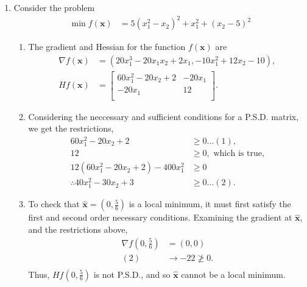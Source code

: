 \documentclass[a4paper,11pt]{article}
\newcommand{\ds}{\displaystyle}
\begin{document}
{{\begin{enumerate}[leftmargin=*]
		\item Consider the problem
			\begin{align*}
				\min f(\mathbf{x}) & = 5(x_1^2 - x_2)^2 + x_1^2 + (x_2-5)^2
			\end{align*}
			\begin{enumerate}[label=\alph*)]
				\item The gradient and Hessian for the function $\ds{f(\mathbf{x})}$ are
					\begin{align*}
						\nabla f(\mathbf{x}) & = \left(20x_1^3-20x_1x_2+2x_1, -10x_1^2+12x_2-10\right), \\
						Hf(\mathbf{x}) & = 
						\begin{bmatrix}
							60x_1^2-20x_2+2 & -20x_1 \\
							-20x_1 & 12 \\
						\end{bmatrix}.
					\end{align*}
				\item Considering the neccessary and sufficient conditions for a P.S.D. matrix, we get the restrictions,
					\begin{align*}
						60x_1^2-20x_2+2 & \geq 0 \dots (1), \\
						12 & \geq 0, \text{ which is true,} \\
						12(60x_1^2-20x_2+2) - 400 x_1^2 & \geq 0 \\
						\therefore 40x_1^2 - 30x_2 + 3 & \geq 0 \dots (2).
					\end{align*}

				\item To check that $\ds{\hat{\mathbf{x}} = \left(0,\frac{5}{6}\right)}$ is a local minimum, it must first satisfy the first and second order necessary conditions. Examining the gradient at $\ds{\hat{\mathbf{x}}}$, and the restrictions above,
					\begin{align*}
						\nabla f\left(0, \frac{5}{6} \right) & = (0,0) \\
						(2) & \rightarrow -22 \ngeq 0. \\
					\end{align*}
					Thus, $\ds{Hf\left(0, \frac{5}{6}\right)}$ is not P.S.D., and so $\ds{\hat{\mathbf{x}}}$ cannot be a local minimum.

			\end{enumerate}


\end{enumerate}}}
\end{document}
